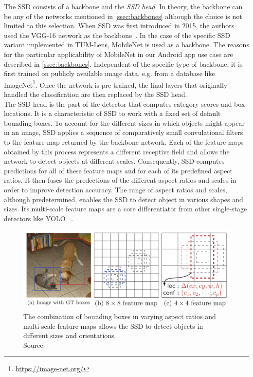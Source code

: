 \documentclass[
			   fontsize=11pt,
               paper=a4,
               bibliography=totoc,
               idxtotoc,
               headsepline,
               footsepline,
               footinclude=false,
               BCOR=12mm,
               DIV=13,
               openany,   %
               ]
               {scrbook}
\begin{document}
The SSD consists of a backbone and the \textit{SSD head}. In theory, the backbone can be any of the networks mentioned in \autoref{ssec:backbones} although the choice is not limited to this selection. When SSD was first introduced  in 2015, the authors used the VGG-16 network as the backbone~\cite{detectorSSD}. In the case of the specific SSD variant implemented in TUM-Lens, MobileNet is used as a backbone. The reasons for the particular applicability of MobileNet in our Android app use case are described in \autoref{ssec:backbones}. Independent of the specific type of backbone, it is first trained on publicly available image data, e.g. from a database like ImageNet\footnote{\url{https://image-net.org/}}. Once the network is pre-trained, the final layers that originally handled the classification are then replaced by the SSD head. \\

The SSD head is the part of the detector that computes category scores and box locations. It is a characteristic of SSD to work with a fixed set of default bounding boxes. To account for the different sizes in which objects might appear in an image, SSD applies a sequence of comparatively small convulational filters to the feature map returned by the backbone network. Each of the feature maps obtained by this process represents a different receptive field and allows the network to detect objects at different scales. Consequently, SSD computes  predictions for all of these feature maps and for each of its predefined aspect ratios. It then fuses the predections of the different aspect ratios and scales in order to improve detection accuracy. The range of aspect ratios and scales, although predetermined, enables the SSD to detect object in various shapes and sizes. Its multi-scale feature maps are a core differentiator from other single-stage detectors like YOLO~\cite{detectorSSD, detectorYOLOv1} .

\begin{figure}[H] %
	\centering
	\includegraphics[width=\textwidth]{figures/ssd_feature_maps_scaling.png}
	\caption[Detecting Objects at Different Scales through SSD's Feature Maps]{The combination of bounding boxes in varying aspect ratios and multi-scale feature maps allows the SSD to detect objects in different sizes and orientations.\\
		\tiny{Source:~\cite{detectorSSD}}}
	\label{fig:ssdFeatureMapScaling} %
\end{figure}
\end{document}
